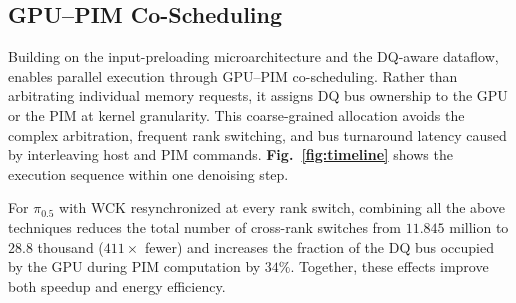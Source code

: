 \subsection{GPU--PIM Co-Scheduling}
\label{sec:dataflow-b}
Building on the input-preloading microarchitecture and the DQ-aware dataflow, \sys{} enables parallel execution through GPU--PIM co-scheduling. Rather than arbitrating individual memory requests, it assigns DQ bus ownership to the GPU or the PIM at kernel granularity. This coarse-grained allocation avoids the complex arbitration, frequent rank switching, and bus turnaround latency caused by interleaving host and PIM commands. \textbf{Fig.~\ref{fig:timeline}} shows the execution sequence within one denoising step.

For $\pi_{0.5}$ with WCK resynchronized at every rank switch, combining all the above techniques reduces the total number of cross-rank switches from $11.845$ million to $28.8$ thousand ($411\times$ fewer) and increases the fraction of the DQ bus occupied by the GPU during PIM computation by $34\%$. Together, these effects improve both speedup and energy efficiency.